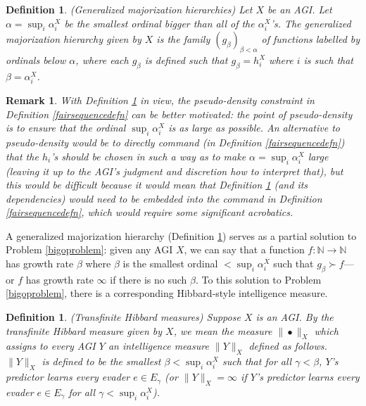 \documentclass{article}
\newtheorem{definition}[theorem]{Definition}
\newtheorem{remark}[theorem]{Remark}
\begin{document}
\begin{definition}
\label{generalizedmajorizationhierarchydefn}
(Generalized majorization hierarchies)
    Let $X$ be an AGI. Let $\alpha=\sup_i \alpha^X_i$ be the smallest ordinal
    bigger than all of the $\alpha^X_i$'s. The \emph{generalized majorization
    hierarchy given by $X$} is the family $(g_\beta)_{\beta<\alpha}$ of functions
    labelled by ordinals below $\alpha$, where each $g_{\beta}$ is defined
    such that $g_{\beta}=h^X_i$ where $i$ is such that $\beta=\alpha^X_i$.
\end{definition}

\begin{remark}
\label{pseudodensityremark}
With Definition \ref{generalizedmajorizationhierarchydefn} in view,
the pseudo-density
constraint in Definition \ref{fairsequencedefn} can be better motivated:
the point of pseudo-density is to ensure that the ordinal
$\sup_i \alpha^X_i$ is as large as possible. An alternative to pseudo-density would
be to directly command (in Definition \ref{fairsequencedefn}) that the $h_i$'s should
be chosen in such a way as to make $\alpha=\sup_i\alpha^X_i$ large (leaving it up
to the AGI's judgment and discretion how to interpret that), but this would be
difficult because it would mean that Definition \ref{generalizedmajorizationhierarchydefn}
(and its dependencies) would need to be embedded into the command in
Definition \ref{fairsequencedefn}, which would require some significant acrobatics.
\end{remark}

A generalized majorization hierarchy (Definition \ref{generalizedmajorizationhierarchydefn})
serves as a partial solution to Problem \ref{bigoproblem}: given any AGI $X$, we can say
that a function $f:\mathbb N\to\mathbb N$ has growth rate
$\beta$ where $\beta$ is the smallest ordinal $<\sup_i \alpha^X_i$
such that $g_\beta\succ f$---or $f$ has growth rate $\infty$ if there is no
such $\beta$. To this solution to Problem \ref{bigoproblem}, there is a corresponding
Hibbard-style intelligence measure.

\begin{definition}
    (Transfinite Hibbard measures)
    Suppose $X$ is an AGI. By the \emph{transfinite Hibbard measure given by $X$},
    we mean the measure $\|\bullet\|_X$ which assigns to every AGI $Y$ an
    intelligence measure $\|Y\|_X$ defined as follows.
    $\|Y\|_X$ is defined to be the smallest $\beta<\sup_i\alpha^X_i$
    such that for all $\gamma<\beta$,
    $Y$'s predictor learns every evader $e\in E_\gamma$ (or $\|Y\|_X=\infty$ if
    $Y$'s predictor learns every evader $e\in E_\gamma$ for all
    $\gamma<\sup_i \alpha^X_i$).
\end{definition}
\end{document}
